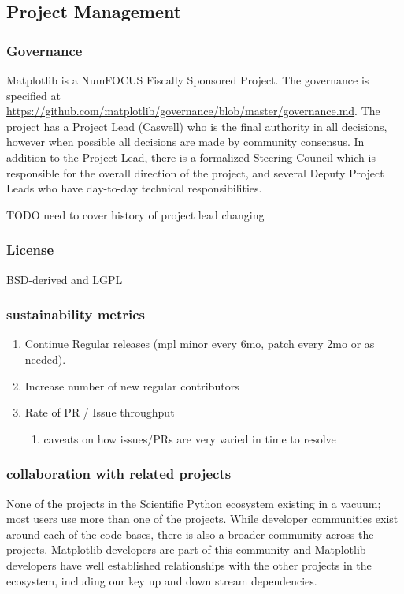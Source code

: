 \documentclass[12pt]{article}
\numberwithin{page}{section}
\begin{document}
\subsection{Project Management}
\subsubsection{Governance}
Matplotlib is a NumFOCUS Fiscally Sponsored Project.  The governance
is specified at
\url{https://github.com/matplotlib/governance/blob/master/governance.md}.
The project has a Project Lead (Caswell) who is the final authority in
all decisions, however when possible all decisions are made by
community consensus.  In addition to the Project Lead, there is a
formalized Steering Council which is responsible for the overall
direction of the project, and several Deputy Project Leads who have
day-to-day technical responsibilities.

TODO need to cover history of project lead changing



\subsubsection{License}

BSD-derived and LGPL

\subsubsection{sustainability metrics}
\begin{enumerate}
\item Continue Regular releases (mpl minor every 6mo, patch every 2mo
  or as needed).
\item Increase number of new regular contributors
\item Rate of PR / Issue throughput
  \begin{enumerate}
  \item caveats on how issues/PRs are very varied in time to resolve
  \end{enumerate}
\end{enumerate}

\subsubsection{collaboration with related projects}

None of the projects in the Scientific Python ecosystem existing in a
vacuum; most users use more than one of the projects.  While developer
communities exist around each of the code bases, there is also a
broader community across the projects.  Matplotlib developers are part
of this community and Matplotlib developers have well established
relationships with the other projects in the ecosystem, including our
key up and down stream dependencies.
\end{document}
